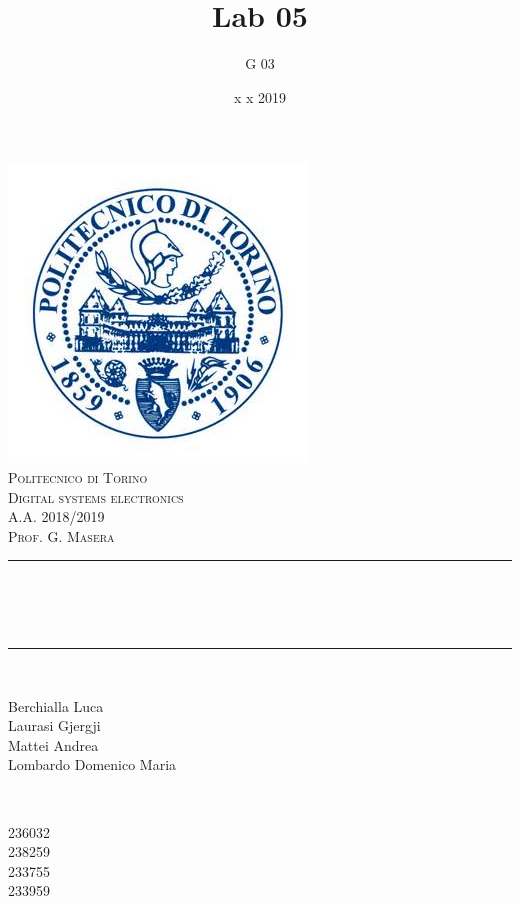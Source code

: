 \documentclass[12pt]{article}
\title{Lab 05}													%
\author{G 03}														%
\date{x x 2019}														%
\makeatletter
\let\thetitle\@title
\let\thedate\@date
\makeatother
\begin{document}

\begin{titlepage}
	\centering
    \vspace*{0.5 cm}
    \includegraphics[scale = 0.75]{polito.jpg}\\[1.0 cm]				%
    \textsc{\LARGE Politecnico di Torino}\\[2.0 cm]						%
	\textsc{\Large Digital systems electronics\\ A.A. 2018/2019}\\[0.5 cm]		%
	\textsc{\Large Prof. G. Masera}\\[0.5 cm]		%
	\rule{\linewidth}{0.2 mm} \\[0.4 cm]
	{ \huge \bfseries \thetitle \\ \small \thedate}\\
	\rule{\linewidth}{0.2 mm} \\[1.5 cm]
	
	\begin{minipage}{0.4\textwidth}
		\begin{flushleft} \large
			Berchialla Luca\\												%
			Laurasi Gjergji
			\\
			
			Mattei Andrea\\
            Lombardo Domenico Maria\\
            
			\end{flushleft}
			\end{minipage}~
			\begin{minipage}{0.4\textwidth}
            
			\begin{flushright} \large
			236032\\													%
			238259\\
            233755\\
            233959\\
            
		\end{flushright}
        
	\end{minipage}\\[2 cm]
	
\end{titlepage}
\end{document}
